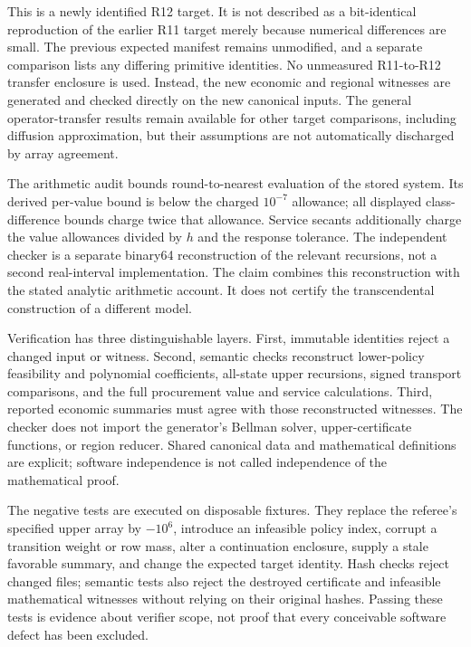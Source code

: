 This is a newly identified R12 target. It is not described as a bit-identical reproduction of the earlier R11 target merely because numerical differences are small. The previous expected manifest remains unmodified, and a separate comparison lists any differing primitive identities. No unmeasured R11-to-R12 transfer enclosure is used. Instead, the new economic and regional witnesses are generated and checked directly on the new canonical inputs. The general operator-transfer results remain available for other target comparisons, including diffusion approximation, but their assumptions are not automatically discharged by array agreement.

The arithmetic audit bounds round-to-nearest evaluation of the stored system. Its derived per-value bound is below the charged $10^{-7}$ allowance; all displayed class-difference bounds charge twice that allowance. Service secants additionally charge the value allowances divided by $h$ and the response tolerance. The independent checker is a separate binary64 reconstruction of the relevant recursions, not a second real-interval implementation. The claim combines this reconstruction with the stated analytic arithmetic account. It does not certify the transcendental construction of a different model.

Verification has three distinguishable layers. First, immutable identities reject a changed input or witness. Second, semantic checks reconstruct lower-policy feasibility and polynomial coefficients, all-state upper recursions, signed transport comparisons, and the full procurement value and service calculations. Third, reported economic summaries must agree with those reconstructed witnesses. The checker does not import the generator's Bellman solver, upper-certificate functions, or region reducer. Shared canonical data and mathematical definitions are explicit; software independence is not called independence of the mathematical proof.

The negative tests are executed on disposable fixtures. They replace the referee's specified upper array by $-10^6$, introduce an infeasible policy index, corrupt a transition weight or row mass, alter a continuation enclosure, supply a stale favorable summary, and change the expected target identity. Hash checks reject changed files; semantic tests also reject the destroyed certificate and infeasible mathematical witnesses without relying on their original hashes. Passing these tests is evidence about verifier scope, not proof that every conceivable software defect has been excluded.

